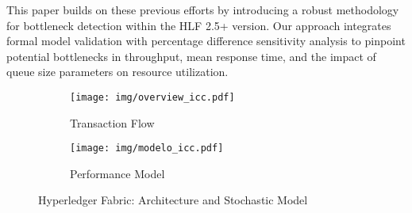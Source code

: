 This paper builds on these previous efforts by introducing a robust methodology for bottleneck detection within the HLF 2.5+ version. Our approach integrates formal model validation with percentage difference sensitivity analysis to pinpoint potential bottlenecks in throughput, mean response time, and the impact of queue size parameters on resource utilization.

\begin{figure*}[htpb]
    \centering    
    \begin{subfigure}{\textwidth}
        \centering
        \texttt{[image: img/overview\_icc.pdf]}
        \caption{Transaction Flow}
        \label{fig_overview}
    \end{subfigure}%
    \hfill
    \begin{subfigure}{\textwidth}
        \centering
        \texttt{[image: img/modelo\_icc.pdf]}
        \caption{Performance Model}
        \label{fig_spn_model}
    \end{subfigure}
    \vspace{-10pt}
    \caption{Hyperledger Fabric: Architecture and Stochastic Model}
    \label{fig_combined_figs}
\end{figure*}


